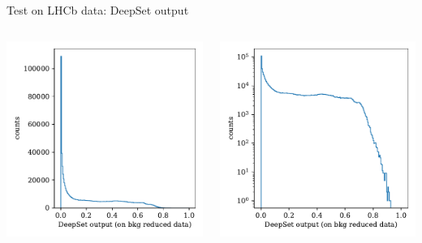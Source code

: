 \documentclass[aspectratio=1610, 10pt]{beamer}
\begin{document}
\begin{frame}{Test on LHCb data: DeepSet output}
  \begin{columns}
    \begin{column}{0.5\textwidth}
      \centering
      \includegraphics[width=\textwidth]{images/backup/data_ProbBs.pdf}
    \end{column}
    \begin{column}{0.5\textwidth}
      \centering
      \includegraphics[width=\textwidth]{images/backup/data_ProbBs_logy.pdf}
    \end{column}
  \end{columns}
\end{frame}
\end{document}
